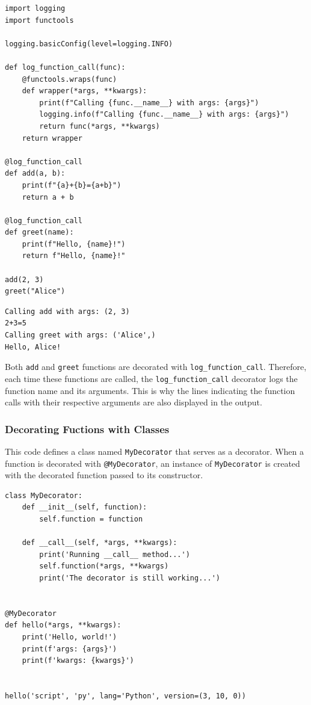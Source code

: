 \begin{codebox}
\begin{verbatim}
import logging
import functools

logging.basicConfig(level=logging.INFO)

def log_function_call(func):
    @functools.wraps(func)
    def wrapper(*args, **kwargs):
        print(f"Calling {func.__name__} with args: {args}")
        logging.info(f"Calling {func.__name__} with args: {args}")
        return func(*args, **kwargs)
    return wrapper

@log_function_call
def add(a, b):
    print(f"{a}+{b}={a+b}")
    return a + b

@log_function_call
def greet(name):
    print(f"Hello, {name}!")
    return f"Hello, {name}!"

add(2, 3)
greet("Alice")
\end{verbatim}
\end{codebox}

\newpage
\begin{verbatim}
Calling add with args: (2, 3)
2+3=5
Calling greet with args: ('Alice',)
Hello, Alice!
\end{verbatim}

Both \texttt{add} and \texttt{greet} functions are decorated with \texttt{log\_function\_call}. Therefore, each time these functions are called, the \texttt{log\_function\_call} decorator logs the function name and its arguments. This is why the lines indicating the function calls with their respective arguments are also displayed in the output.

\subsubsection{Decorating Fuctions with Classes}
This code defines a class named \texttt{MyDecorator} that serves as a decorator. When a function is decorated with \texttt{@MyDecorator}, an instance of \texttt{MyDecorator} is created with the decorated function passed to its constructor.
\begin{codebox}
\begin{verbatim}
class MyDecorator:
    def __init__(self, function):
        self.function = function
 
    def __call__(self, *args, **kwargs):
        print('Running __call__ method...')
        self.function(*args, **kwargs)
        print('The decorator is still working...')
 
 
@MyDecorator
def hello(*args, **kwargs):
    print('Hello, world!')
    print(f'args: {args}')
    print(f'kwargs: {kwargs}')
 
 
hello('script', 'py', lang='Python', version=(3, 10, 0))
\end{verbatim}
\end{codebox}

